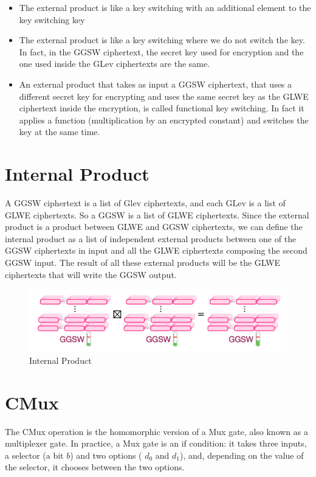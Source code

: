 \documentclass{techrep}
\theoremstyle{definition}
\theoremstyle{plain}
\begin{document}
\begin{itemize}
  \item The external product is like a key switching with an additional element to the key switching key
  \item The external product is like a key switching where we do not switch the key. In fact, in the GGSW ciphertext, the secret key used for encryption and the one used inside the GLev ciphertexts are the same.  
  \item An external product that takes as input a GGSW ciphertext, that uses a different secret key for encrypting and uses the same secret key 
 as the GLWE ciphertext inside the encryption, is called functional key switching. In fact it applies a function (multiplication by an encrypted constant) and switches the key at the same time.  

\end{itemize}

\section{Internal Product}
A GGSW ciphertext is a list of Glev ciphertexts, and each GLev is a list of GLWE ciphertexts. So a GGSW is a list of GLWE ciphertexts. Since the external product is a product between GLWE and GGSW ciphertexts, we can define the internal product as a list of independent external products between one of the GGSW ciphertexts in input and all the GLWE ciphertexts composing the second GGSW input. The result of all these external products will be the GLWE ciphertexts that will write the GGSW output.


	\begin{figure}[H]
		\centering
	\includegraphics[width=0.9\columnwidth]{fig/inter-prod.png}
		\caption{Internal Product}
		\label{fig:internalproduct}
	\end{figure}

\section{CMux}
The CMux operation is the homomorphic version of a Mux gate, also known as a multiplexer gate. In practice, a Mux gate is an if condition: it takes three inputs, a selector (a bit $b$) and two options ( $d_0$ and $d_1$), and, depending on the value of the selector, it chooses between the two options.
\end{document}
